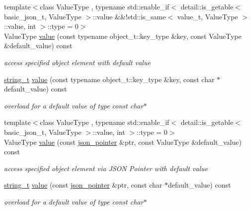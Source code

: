 \begin{DoxyCompactItemize}
{\footnotesize template$<$class Value\+Type , typename std\+::enable\+\_\+if$<$ detail\+::is\+\_\+getable$<$ basic\+\_\+json\+\_\+t, Value\+Type $>$\+::value \&\&!std\+::is\+\_\+same$<$ value\+\_\+t, Value\+Type $>$\+::value, int $>$\+::type  = 0$>$ }\\Value\+Type \hyperlink{classnlohmann_1_1basic__json_ac9e014095170d72c4c57e3daf8efc059}{value} (const typename object\+\_\+t\+::key\+\_\+type \&key, const Value\+Type \&default\+\_\+value) const 
\begin{DoxyCompactList}\small\item\em access specified object element with default value \end{DoxyCompactList}\item 
\hyperlink{classnlohmann_1_1basic__json_a33593865ffb1860323dcbd52425b90c8}{string\+\_\+t} \hyperlink{classnlohmann_1_1basic__json_a4976904f3320a5a9896742de35c7d3e1}{value} (const typename object\+\_\+t\+::key\+\_\+type \&key, const char $\ast$default\+\_\+value) const 
\begin{DoxyCompactList}\small\item\em overload for a default value of type const char$\ast$ \end{DoxyCompactList}\item 
{\footnotesize template$<$class Value\+Type , typename std\+::enable\+\_\+if$<$ detail\+::is\+\_\+getable$<$ basic\+\_\+json\+\_\+t, Value\+Type $>$\+::value, int $>$\+::type  = 0$>$ }\\Value\+Type \hyperlink{classnlohmann_1_1basic__json_a0412570ccb3a87690f6f2c043ef961b8}{value} (const \hyperlink{classnlohmann_1_1basic__json_aa8f1f93b32da01b42413643be32b2c27}{json\+\_\+pointer} \&ptr, const Value\+Type \&default\+\_\+value) const 
\begin{DoxyCompactList}\small\item\em access specified object element via J\+S\+ON Pointer with default value \end{DoxyCompactList}\item 
\hyperlink{classnlohmann_1_1basic__json_a33593865ffb1860323dcbd52425b90c8}{string\+\_\+t} \hyperlink{classnlohmann_1_1basic__json_a70b0721f01af67fa596ab5d11dec9773}{value} (const \hyperlink{classnlohmann_1_1basic__json_aa8f1f93b32da01b42413643be32b2c27}{json\+\_\+pointer} \&ptr, const char $\ast$default\+\_\+value) const 
\begin{DoxyCompactList}\small\item\em overload for a default value of type const char$\ast$ \end{DoxyCompactList}\item 

\end{DoxyCompactItemize}
